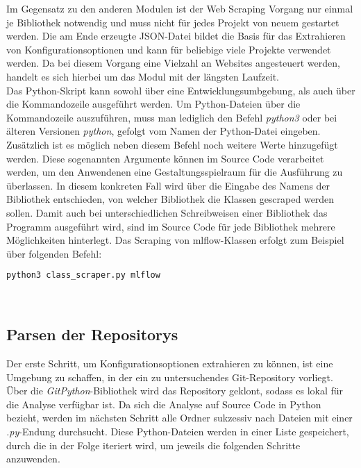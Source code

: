 \documentclass[german,bachelor]{swsLeipzig}
\begin{document}
Im Gegensatz zu den anderen Modulen ist der Web Scraping Vorgang nur einmal je Bibliothek notwendig und muss nicht für jedes Projekt
von neuem gestartet werden.
Die am Ende erzeugte JSON-Datei bildet die Basis für das Extrahieren von Konfigurationsoptionen und kann für beliebige viele
Projekte verwendet werden.
Da bei diesem Vorgang eine Vielzahl an Websites angesteuert werden, handelt es sich hierbei um das Modul mit der längsten Laufzeit.\\

Das Python-Skript kann sowohl über eine Entwicklungsumbgebung, als auch über die Kommandozeile ausgeführt werden.
Um Python-Dateien über die Kommandozeile auszuführen, muss man lediglich den Befehl \textit{python3} oder bei älteren
Versionen \textit{python}, gefolgt vom Namen der Python-Datei eingeben.
Zusätzlich ist es möglich neben diesem Befehl noch weitere Werte hinzugefügt werden.
Diese sogenannten Argumente können im Source Code verarbeitet werden, um den Anwendenen eine Gestaltungsspielraum für
die Ausführung zu überlassen.
In diesem konkreten Fall wird über die Eingabe des Namens der Bibliothek entschieden, von welcher Bibliothek die
Klassen gescraped werden sollen.
Damit auch bei unterschiedlichen Schreibweisen einer Bibliothek das Programm ausgeführt wird, sind im Source Code für jede
Bibliothek mehrere Möglichkeiten hinterlegt.
Das Scraping von mlflow-Klassen erfolgt zum Beispiel über folgenden Befehl:\\

\begin{lstlisting}[language=bash, frame=single, basicstyle=\small]
python3 class_scraper.py mlflow
\end{lstlisting}
\

\subsection{Parsen der Repositorys}
Der erste Schritt, um Konfigurationsoptionen extrahieren zu können, ist eine Umgebung zu schaffen, in der ein zu untersuchendes
Git-Repository vorliegt.
Über die \textit{GitPython}-Bibliothek wird das Repository geklont, sodass es lokal für die Analyse verfügbar ist.
Da sich die Analyse auf Source Code in Python bezieht, werden im nächsten Schritt alle Ordner sukzessiv nach Dateien mit
einer \textit{.py}-Endung durchsucht.
Diese Python-Dateien werden in einer Liste gespeichert, durch die in der Folge iteriert wird, um jeweils die folgenden
Schritte anzuwenden. \\
\end{document}
